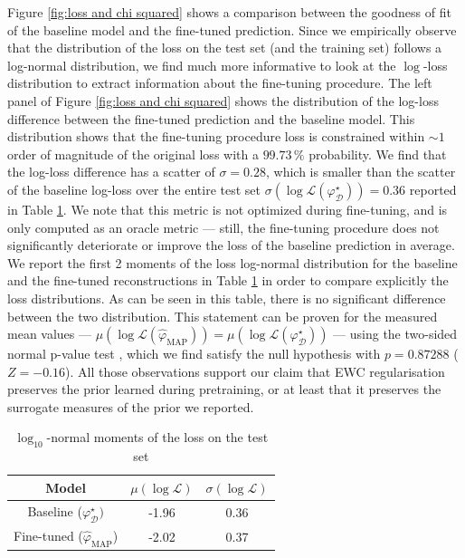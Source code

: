 Figure \ref{fig:loss and chi squared} shows a comparison between 
the goodness of fit of the baseline model and the fine-tuned prediction. 
Since we empirically observe that the distribution of the loss on the test set (and the training set) follows a log-normal distribution, we find much more informative to look at the $\log$-loss 
distribution to extract information about the fine-tuning procedure. 
The left panel of Figure \ref{fig:loss and chi squared} 
shows the distribution of the log-loss difference between the fine-tuned prediction and the baseline model. This distribution shows that the fine-tuning procedure loss is constrained within $\sim 1$ order of magnitude of the original loss with a $99.73\,\%$ probability. We find that the log-loss difference has a scatter of $\sigma = 0.28$, which is smaller than the scatter of the baseline log-loss over the entire test set $\sigma(\log \mathcal{L}(\varphi^\star_{\mathcal{D}})) = 0.36$ reported in Table \ref{tab:loss}.
We note that this metric is not optimized during fine-tuning, 
and is only computed as an oracle metric --- still, the fine-tuning procedure does not significantly deteriorate or improve the loss of the baseline prediction in average. We report the first 2 moments of the loss log-normal distribution for the baseline and the fine-tuned reconstructions in Table \ref{tab:loss} in order to compare explicitly the loss distributions. As can be seen in this table, there is no significant difference between the two distribution. This statement can be proven for the measured mean values --- $\mu(\log \mathcal{L}(\hat{\varphi}_{\mathrm{MAP}})) = \mu(\log \mathcal{L}(\varphi^{\star}_{\mathcal{D}})) $ --- using the two-sided normal p-value test \citep{Casella2001}, which we find satisfy the null hypothesis with $p=0.87288$ ($Z = -0.16$). All those observations support our claim that EWC regularisation preserves the prior learned during pretraining, or at least that it preserves the surrogate measures of the prior we reported. 
\begin{table}[H]
    \centering
    \caption{$\log_{10}$-normal moments of the loss on the test set}
    \label{tab:loss}
    \begin{tabular}{ccc}
        \hline
          Model  & $\mu(\log \mathcal{L})$ & $\sigma(\log \mathcal{L})$ \\
        \hline \hline
        Baseline ($\varphi_{\mathcal{D}}^\star)$ &  -1.96 & 0.36 \\
        Fine-tuned ($\hat{\varphi}_{\mathrm{MAP}}$) & -2.02 & 0.37 \\\hline
    \end{tabular}

\end{table}

